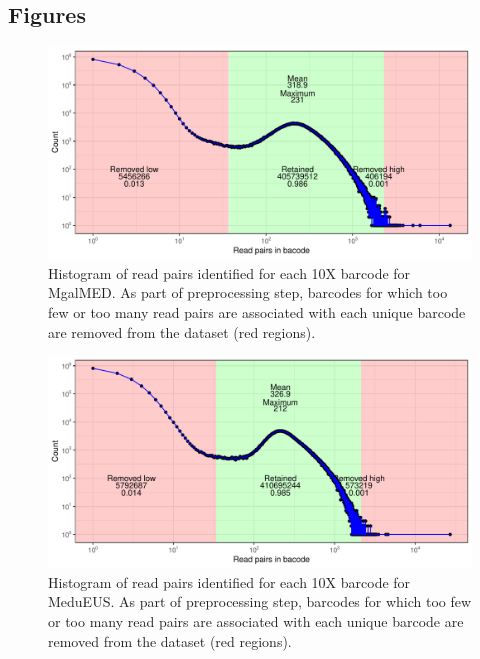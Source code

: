 \documentclass[11pt, a4paper]{article}
\begin{document}
\subsection*{Figures}
\begin{figure}[h]
	\includegraphics[width=\linewidth]{figures/supfig_MgalMED_preproc_barcode_filt.pdf}
	\caption{Histogram of read pairs identified for each 10X barcode for MgalMED.
		As part of preprocessing step, barcodes for which too few or too many read pairs are associated with each unique barcode are removed from the dataset (red regions).}
	\label{supfig:preproc_MgalMED}
\end{figure}

\begin{figure}[h]
	\includegraphics[width=\linewidth]{figures/supfig_MeduEUS_preproc_barcode_filt.pdf}
	\caption{Histogram of read pairs identified for each 10X barcode for MeduEUS.
		As part of preprocessing step, barcodes for which too few or too many read pairs are associated with each unique barcode are removed from the dataset (red regions).}
	\label{supfig:preproc_MeduEUS}
\end{figure}
\end{document}
